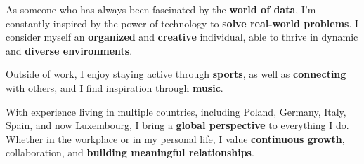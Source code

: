 

\begin{cvparagraph}

As someone who has always been fascinated by the \textbf{world of data}, I’m constantly inspired by the power of technology to\textbf{ solve real-world problems}. I consider myself an \textbf{organized} and \textbf{creative} individual, able to thrive in dynamic and \textbf{diverse environments}. 

Outside of work, I enjoy staying active through \textbf{sports}, as well as \textbf{connecting} with others, and I find inspiration through \textbf{music}.

With experience living in multiple countries, including Poland, Germany, Italy, Spain, and now Luxembourg, I bring a \textbf{global perspective} to everything I do. Whether in the workplace or in my personal life, I value \textbf{continuous growth}, collaboration, and \textbf{building meaningful relationships}.
\end{cvparagraph}
